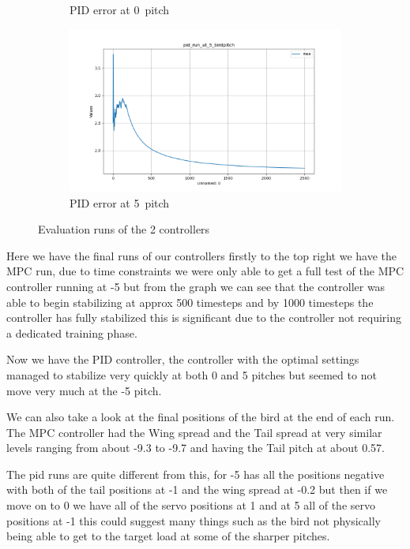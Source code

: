 \begin{figure}[h!]
\begin{subfigure}[b]{0.49\textwidth}
        \caption{PID error at 0\textdegree\ pitch}
    \end{subfigure}
    \begin{subfigure}[b]{0.49\textwidth}
        \centering
        \includegraphics[width=\textwidth]{./img/pid_run_at_5_birdpitch.png}
        \caption{PID error at 5\textdegree\ pitch}
    \end{subfigure}
    \caption{Evaluation runs of the 2 controllers}
    \label{fig:four_images}
\end{figure}

    Here we have the final runs of our controllers firstly to the top right
    we have the MPC run, due to time constraints we were only able to get a
    full test of the MPC controller running at -5\textdegree{} but from the
    graph we can see that the controller was able to begin stabilizing at
    approx 500 timesteps and by 1000 timesteps the controller has fully
    stabilized this is significant due to the controller not requiring a
    dedicated training phase.


    Now we have the PID controller, the controller with the optimal
    settings managed to stabilize very quickly at both 0\textdegree{}
    and 5\textdegree{} pitches but seemed to not move very much at the
    -5\textdegree{} pitch.


    We can also take a look at the final positions of the bird at the
    end of each run. The MPC controller had the Wing spread and the Tail
    spread at very similar levels ranging from about -9.3 to -9.7 and having
    the Tail pitch at about 0.57.

    The pid runs are quite different from this, for -5\textdegree{} has all the
    positions negative with both of the tail positions at -1 and the wing spread
    at -0.2 but then if we move on to 0\textdegree{} we have all of the servo
    positions at 1 and at 5\textdegree{} all of the servo positions at -1 this
    could suggest many things such as the bird not physically being able to get
    to the target load at some of the sharper pitches.

